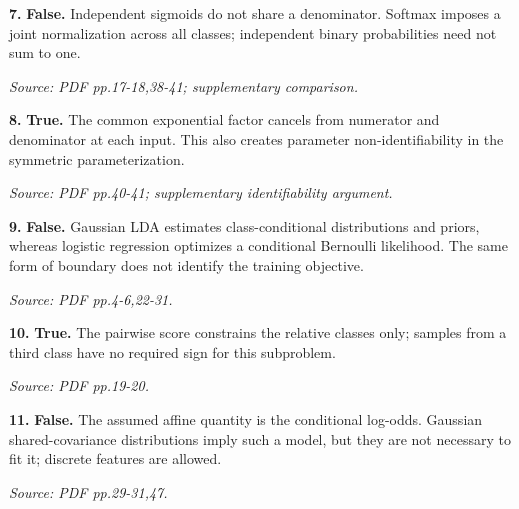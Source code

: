 \documentclass[11pt,a4paper]{article}
\begin{document}
\par\noindent\begin{minipage}{\linewidth}
\textbf{7.} \textbf{False.} Independent sigmoids do not share a denominator. Softmax imposes a joint normalization across all classes; independent binary probabilities need not sum to one.

{\footnotesize\textit{Source: PDF pp.17-18,38-41; supplementary comparison.}}
\end{minipage}\par\vspace{3mm}
\par\noindent\begin{minipage}{\linewidth}
\textbf{8.} \textbf{True.} The common exponential factor cancels from numerator and denominator at each input. This also creates parameter non-identifiability in the symmetric parameterization.

{\footnotesize\textit{Source: PDF pp.40-41; supplementary identifiability argument.}}
\end{minipage}\par\vspace{3mm}
\par\noindent\begin{minipage}{\linewidth}
\textbf{9.} \textbf{False.} Gaussian LDA estimates class-conditional distributions and priors, whereas logistic regression optimizes a conditional Bernoulli likelihood. The same form of boundary does not identify the training objective.

{\footnotesize\textit{Source: PDF pp.4-6,22-31.}}
\end{minipage}\par\vspace{3mm}
\par\noindent\begin{minipage}{\linewidth}
\textbf{10.} \textbf{True.} The pairwise score constrains the relative classes only; samples from a third class have no required sign for this subproblem.

{\footnotesize\textit{Source: PDF pp.19-20.}}
\end{minipage}\par\vspace{3mm}
\par\noindent\begin{minipage}{\linewidth}
\textbf{11.} \textbf{False.} The assumed affine quantity is the conditional log-odds. Gaussian shared-covariance distributions imply such a model, but they are not necessary to fit it; discrete features are allowed.

{\footnotesize\textit{Source: PDF pp.29-31,47.}}
\end{minipage}\par\vspace{3mm}
\end{document}
